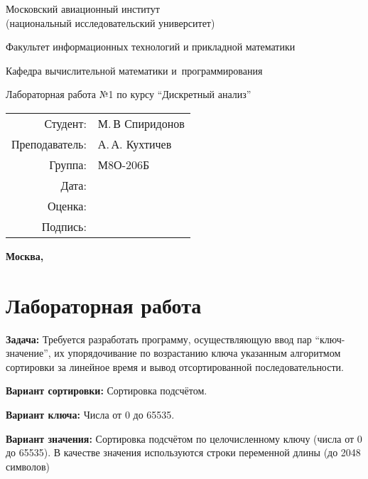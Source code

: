 \documentclass[pdf, unicode, 12pt, a4paper,oneside,fleqn]{article}
\newcommand{\CWHeader}[1]{\section*{#1}}
\newcommand{\CWProblem}[1]{\par\textbf{Задача: }#1}
\begin{document}
\begin{center}
\bfseries

{\Large Московский авиационный институт\\ (национальный исследовательский университет)

}

\vspace{48pt}

{\large Факультет информационных технологий и прикладной математики
}

\vspace{36pt}


{\large Кафедра вычислительной математики и~программирования

}


\vspace{48pt}

Лабораторная работа №1 по курсу \enquote{Дискретный анализ}

\end{center}

\vspace{72pt}

\begin{flushright}
\begin{tabular}{rl}
Студент: & М.\,В Спиридонов \\
Преподаватель: & А.\,А. Кухтичев \\
Группа: & М8О-206Б \\
Дата: & \\
Оценка: & \\
Подпись: & \\
\end{tabular}
\end{flushright}

\vfill
\pagestyle{empty}
\begin{center}
\bfseries
Москва, \the\year
\end{center}
\pagebreak

\CWHeader{Лабораторная работа }

\CWProblem{ 
Требуется разработать программу, осуществляющую ввод пар \enquote{ключ-значение}, их 
упорядочивание по возрастанию ключа указанным алгоритмом сортировки за линейное время и вывод отсортированной последовательности.

{\bfseries Вариант сортировки:} { Сортировка подсчётом.}

{\bfseries Вариант ключа:} {  Числа от 0 до 65535. }

{\bfseries Вариант значения:} {  Сортировка подсчётом по целочисленному ключу (числа от 0 до 65535).
В качестве значения используются строки переменной длины (до 2048 символов)}
}
\pagestyle{plain}
\pagebreak
\end{document}
